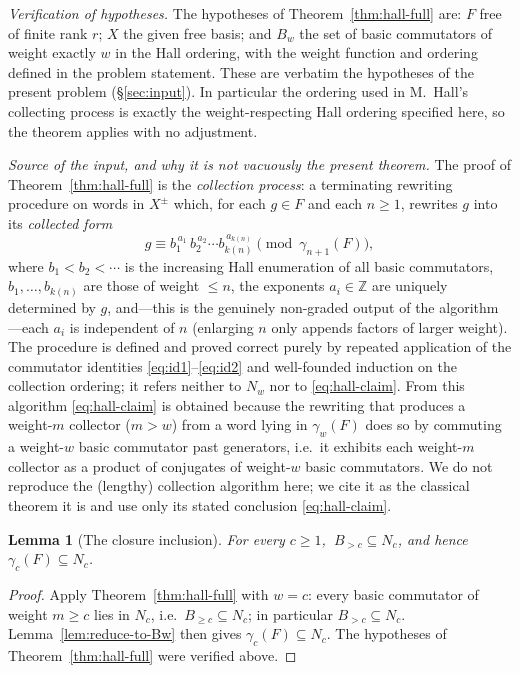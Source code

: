 \documentclass{amsart}
\newtheorem{lemma}{Lemma}
\theoremstyle{definition}
\theoremstyle{remark}
\begin{document}
\smallskip
\emph{Verification of hypotheses.} The hypotheses of
Theorem~\ref{thm:hall-full} are: $F$ free of finite rank $r$; $X$ the given free
basis; and $B_w$ the set of basic commutators of weight exactly $w$ in the Hall
ordering, with the weight function and ordering defined in the problem statement.
These are verbatim the hypotheses of the present problem (\S\ref{sec:input}). In
particular the ordering used in M.\ Hall's collecting process is exactly the
weight-respecting Hall ordering specified here, so the theorem applies with no
adjustment.

\smallskip
\emph{Source of the input, and why it is not vacuously the present theorem.}
The proof of Theorem~\ref{thm:hall-full} is the \emph{collection process}: a
terminating rewriting procedure on words in $X^{\pm}$ which, for each $g\in F$ and
each $n\ge1$, rewrites $g$ into its \emph{collected form}
\begin{equation}\label{eq:collected}
g\equiv b_{1}^{\,a_{1}}\,b_{2}^{\,a_{2}}\cdots b_{k(n)}^{\,a_{k(n)}}
\pmod{\gamma_{n+1}(F)},
\end{equation}
where $b_1<b_2<\cdots$ is the increasing Hall enumeration of all basic
commutators, $b_1,\dots,b_{k(n)}$ are those of weight $\le n$, the exponents
$a_i\in\mathbb Z$ are uniquely determined by $g$, and---this is the genuinely
non-graded output of the algorithm---each $a_i$ is independent of $n$ (enlarging
$n$ only appends factors of larger weight). The procedure is defined and proved
correct purely by repeated application of the commutator identities
\eqref{eq:id1}--\eqref{eq:id2} and well-founded induction on the collection
ordering; it refers neither to $N_w$ nor to \eqref{eq:hall-claim}. From this
algorithm \eqref{eq:hall-claim} is obtained because the rewriting that produces a
weight-$m$ collector ($m>w$) from a word lying in $\gamma_w(F)$ does so by
commuting a weight-$w$ basic commutator past generators, i.e.\ it exhibits each
weight-$m$ collector as a product of conjugates of weight-$w$ basic commutators.
We do not reproduce the (lengthy) collection algorithm here; we cite it as the
classical theorem it is and use only its stated conclusion \eqref{eq:hall-claim}.

\begin{lemma}[The closure inclusion]\label{lem:hall-residual}
For every $c\ge1$, $\ B_{>c}\subseteq N_c$, and hence $\gamma_c(F)\subseteq N_c$.
\end{lemma}

\begin{proof}
Apply Theorem~\ref{thm:hall-full} with $w=c$: every basic commutator of weight
$m\ge c$ lies in $N_c$, i.e.\ $B_{\ge c}\subseteq N_c$; in particular
$B_{>c}\subseteq N_c$. Lemma~\ref{lem:reduce-to-Bw} then gives
$\gamma_c(F)\subseteq N_c$. The hypotheses of Theorem~\ref{thm:hall-full} were
verified above.
\end{proof}
\end{document}
